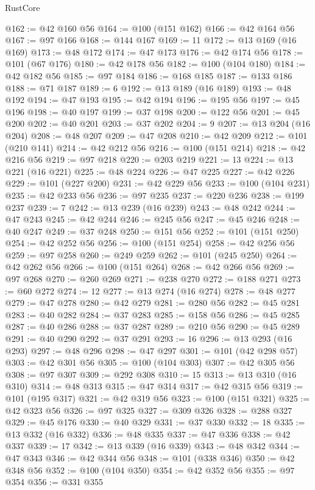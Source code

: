 \begin{lexlean}{RustCore}
\begin{coremodule}
@162 := @42 @160 @56
@164 := @100 (@151 @162)
@166 := @42 @164 @56
@167 := @97 @166
@168 := @144 @167
@169 := 11
@172 := @13 @169 (@16 @169)
@173 := @48 @172
@174 := @47 @173
@176 := @42 @174 @56
@178 := @101 (@67 @176)
@180 := @42 @178 @56
@182 := @100 (@104 @180)
@184 := @42 @182 @56
@185 := @97 @184
@186 := @168 @185
@187 := @133 @186
@188 := @71 @187
@189 := 6
@192 := @13 @189 (@16 @189)
@193 := @48 @192
@194 := @47 @193
@195 := @42 @194
@196 := @195 @56
@197 := @45 @196
@198 := @40 @197
@199 := @37 @198
@200 := @122 @56
@201 := @45 @200
@202 := @40 @201
@203 := @37 @202
@204 := 9
@207 := @13 @204 (@16 @204)
@208 := @48 @207
@209 := @47 @208
@210 := @42 @209
@212 := @101 (@210 @141)
@214 := @42 @212 @56
@216 := @100 (@151 @214)
@218 := @42 @216 @56
@219 := @97 @218
@220 := @203 @219
@221 := 13
@224 := @13 @221 (@16 @221)
@225 := @48 @224
@226 := @47 @225
@227 := @42 @226
@229 := @101 (@227 @200)
@231 := @42 @229 @56
@233 := @100 (@104 @231)
@235 := @42 @233 @56
@236 := @97 @235
@237 := @220 @236
@238 := @199 @237
@239 := 7
@242 := @13 @239 (@16 @239)
@243 := @48 @242
@244 := @47 @243
@245 := @42 @244
@246 := @245 @56
@247 := @45 @246
@248 := @40 @247
@249 := @37 @248
@250 := @151 @56
@252 := @101 (@151 @250)
@254 := @42 @252 @56
@256 := @100 (@151 @254)
@258 := @42 @256 @56
@259 := @97 @258
@260 := @249 @259
@262 := @101 (@245 @250)
@264 := @42 @262 @56
@266 := @100 (@151 @264)
@268 := @42 @266 @56
@269 := @97 @268
@270 := @260 @269
@271 := @238 @270
@272 := @188 @271
@273 := @60 @272
@274 := 12
@277 := @13 @274 (@16 @274)
@278 := @48 @277
@279 := @47 @278
@280 := @42 @279
@281 := @280 @56
@282 := @45 @281
@283 := @40 @282
@284 := @37 @283
@285 := @158 @56
@286 := @45 @285
@287 := @40 @286
@288 := @37 @287
@289 := @210 @56
@290 := @45 @289
@291 := @40 @290
@292 := @37 @291
@293 := 16
@296 := @13 @293 (@16 @293)
@297 := @48 @296
@298 := @47 @297
@301 := @101 (@42 @298 @57)
@303 := @42 @301 @56
@305 := @100 (@104 @303)
@307 := @42 @305 @56
@308 := @97 @307
@309 := @292 @308
@310 := 15
@313 := @13 @310 (@16 @310)
@314 := @48 @313
@315 := @47 @314
@317 := @42 @315 @56
@319 := @101 (@195 @317)
@321 := @42 @319 @56
@323 := @100 (@151 @321)
@325 := @42 @323 @56
@326 := @97 @325
@327 := @309 @326
@328 := @288 @327
@329 := @45 @176
@330 := @40 @329
@331 := @37 @330
@332 := 18
@335 := @13 @332 (@16 @332)
@336 := @48 @335
@337 := @47 @336
@338 := @42 @337
@339 := 17
@342 := @13 @339 (@16 @339)
@343 := @48 @342
@344 := @47 @343
@346 := @42 @344 @56
@348 := @101 (@338 @346)
@350 := @42 @348 @56
@352 := @100 (@104 @350)
@354 := @42 @352 @56
@355 := @97 @354
@356 := @331 @355

\end{coremodule}
\end{lexlean}
